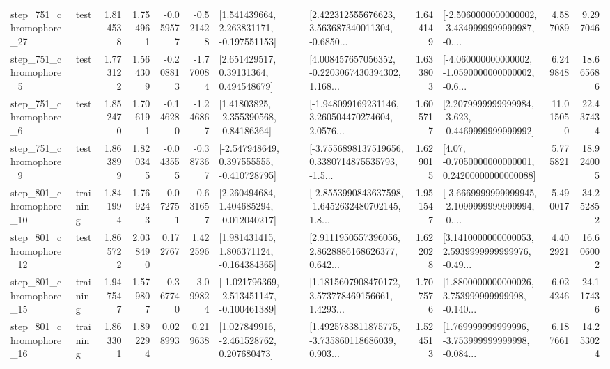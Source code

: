 \begin{tabular}{llrrrrllrlrr}
  step\_751\_chromophore\_27 &      test &      1.814538 &    1.754961 &     -0.059577 & -0.521428 &    [1.541439664, 2.263831171, -0.197551153] &  [2.422312555676623, 3.563687340011304, -0.6850... &       1.644149 &  [-2.5060000000000002, -3.4349999999999987, -0.... &            4.587089 &          9.297046 \\
   step\_751\_chromophore\_5 &      test &      1.773122 &    1.564309 &     -0.208813 & -1.770084 &      [2.651429517, 0.39131364, 0.494548679] &  [4.008457657056352, -0.2203067430394302, 1.168... &       1.633803 &  [-4.060000000000002, -1.0590000000000002, -0.6... &            6.249848 &         18.665686 \\
   step\_751\_chromophore\_6 &      test &      1.852470 &    1.706191 &     -0.146280 & -1.246867 &     [1.41803825, -2.355390568, -0.84186364] &  [-1.948099169231146, 3.260504470274604, 2.0576... &       1.605717 &  [2.2079999999999984, -3.623, -0.4469999999999992] &           11.015050 &         22.437434 \\
   step\_751\_chromophore\_9 &      test &      1.863899 &    1.820345 &     -0.043555 & -0.387367 &   [-2.547948649, 0.397555555, -0.410728795] &  [-3.7556898137519656, 0.3380714875535793, -1.5... &       1.629015 &   [4.07, -0.7050000000000001, 0.24200000000000088] &            5.775821 &         18.924005 \\
  step\_801\_chromophore\_10 &  training &      1.841994 &    1.769243 &     -0.072751 & -0.631657 &    [2.260494684, 1.404685294, -0.012040217] &  [-2.8553990843637598, -1.6452632480702145, 1.8... &       1.951547 &  [-3.6669999999999945, -2.1099999999999994, -0.... &            5.490017 &         34.252852 \\
  step\_801\_chromophore\_12 &      test &      1.865722 &    2.038490 &      0.172767 &  1.422596 &    [1.981431415, 1.806371124, -0.164384365] &  [2.9111950557396056, 2.8628886168626377, 0.642... &       1.622028 &  [3.1410000000000053, 2.5939999999999976, -0.49... &            4.402921 &         16.606002 \\
  step\_801\_chromophore\_15 &  training &      1.947547 &    1.579807 &     -0.367740 & -3.099824 &  [-1.021796369, -2.513451147, -0.100461389] &  [1.1815607908470172, 3.573778469156661, 1.4293... &       1.707576 &  [1.8800000000000026, 3.753999999999998, -0.140... &            6.024246 &         24.117436 \\
  step\_801\_chromophore\_16 &  training &      1.863301 &    1.892294 &      0.028993 &  0.219638 &    [1.027849916, -2.461528762, 0.207680473] &  [1.4925783811875775, -3.735860118686039, 0.903... &       1.524513 &  [1.769999999999996, -3.753999999999998, -0.084... &            6.187661 &         14.253024 \\

\end{tabular}
